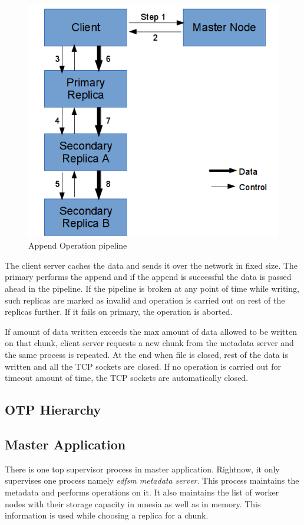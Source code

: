 \documentclass[a4paper,12pt]{article}
\begin{document}
\begin{figure}[h]
  \begin{center}
    \includegraphics[scale = 0.5]{images/append_pipeline}
  \end{center}
  \caption{Append Operation pipeline}
  \label{fig:append_pipeline}
\end{figure}

The client server caches the data and sends it over the network in fixed size. The primary performs the append and if the append is successful the data is passed ahead in the pipeline. If the pipeline is broken at any point of time while writing, such replicas are marked as invalid and operation is carried out on rest of the replicas further. If it fails on primary, the operation is aborted.

If amount of data written exceeds the max amount of data allowed to be written on that chunk, client server requests a new chunk from the metadata server and the same process is repeated. At the end when file is closed, rest of the data is written and all the TCP sockets are closed. If no operation is carried out for timeout amount of time, the TCP sockets are automatically closed.

\subsection{OTP Hierarchy}
\subsection{Master Application}
There is one top supervisor process in master application. Rightnow, it only supervises one process namely \textit{edfsm metadata server}. This process maintains the metadata and performs operations on it. It also maintains the list of worker nodes with their storage capacity in mnesia as well as in memory. This information is used while choosing a replica for a chunk.
\end{document}
